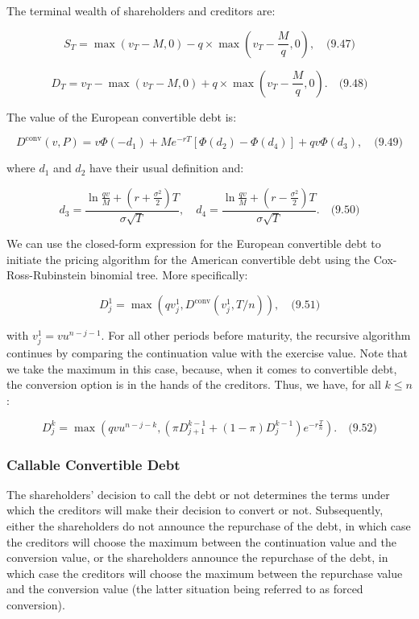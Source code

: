 \documentclass[12pt,a4paper]{article}
\begin{document}
The terminal wealth of shareholders and creditors are:

$$S_T = \max(v_T - M, 0) - q \times \max\left(v_T - \frac{M}{q}, 0\right), \quad \text{(9.47)}$$

$$D_T = v_T - \max(v_T - M, 0) + q \times \max\left(v_T - \frac{M}{q}, 0\right). \quad \text{(9.48)}$$

The value of the European convertible debt is:

$$D^{\text{conv}}(v,P) = v\Phi(-d_1) + Me^{-rT}[\Phi(d_2) - \Phi(d_4)] + qv\Phi(d_3), \quad \text{(9.49)}$$

where $d_1$ and $d_2$ have their usual definition and:

$$d_3 = \frac{\ln \frac{qv}{M} + (r + \frac{\sigma^2}{2})T}{\sigma\sqrt{T}}, \quad d_4 = \frac{\ln \frac{qv}{M} + (r - \frac{\sigma^2}{2})T}{\sigma\sqrt{T}}. \quad \text{(9.50)}$$

We can use the closed-form expression for the European convertible debt to initiate the pricing algorithm for the American convertible debt using the Cox-Ross-Rubinstein binomial tree. More specifically:

$$D_j^1 = \max\left(qv_j^1, D^{\text{conv}}(v_j^1, T/n)\right), \quad \text{(9.51)}$$

with $v_j^1 = vu^{n-j-1}$. For all other periods before maturity, the recursive algorithm continues by comparing the continuation value with the exercise value. Note that we take the maximum in this case, because, when it comes to convertible debt, the conversion option is in the hands of the creditors. Thus, we have, for all $k \leq n$:

$$D_j^k = \max\left(qvu^{n-j-k}, (\pi D_{j+1}^{k-1} + (1-\pi)D_j^{k-1})e^{-r\frac{T}{n}}\right). \quad \text{(9.52)}$$


\subsubsection{Callable Convertible Debt}
The shareholders' decision to call the debt or not determines the terms under which the creditors 
will make their decision to convert or not. Subsequently, either the shareholders do not announce the repurchase of the debt, in 
which case the creditors will choose the maximum between the continuation value and the 
conversion value, or the shareholders announce the repurchase of the debt, in which case the 
creditors will choose the maximum between the repurchase value and the conversion value (the 
latter situation being referred to as forced conversion).
\end{document}
